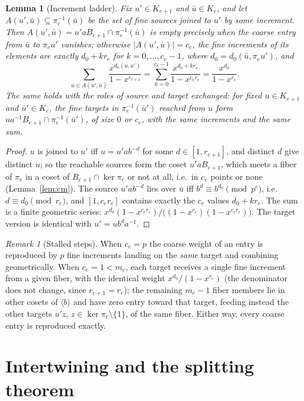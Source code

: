 \documentclass[11pt]{article}
\newtheorem{lemma}[theorem]{Lemma}
\theoremstyle{definition}
\theoremstyle{remark}
\newtheorem{remark}[theorem]{Remark}
\begin{document}
\begin{lemma}[Increment ladder]\label{lem:ladder}
Fix $u'\in K_{e+1}$ and $\bar u\in K_e$, and let $A(u',\bar u)\subseteq\pi_e^{-1}(\bar u)$ be the set of fine sources joined to $u'$ by some increment. Then $A(u',\bar u)=u'aB_{e+1}\cap\pi_e^{-1}(\bar u)$ is empty precisely when the coarse entry from $\bar u$ to $\pi_eu'$ vanishes; otherwise $|A(u',\bar u)|=c_e$, the fine increments of its elements are exactly $d_0+kr_e$ for $k=0,\dots,c_e-1$, where $d_0=d_0(\bar u,\pi_eu')$, and
\[
\sum_{u\in A(u',\bar u)}\frac{x^{d_0(u,u')}}{1-x^{r_{e+1}}}
=\sum_{k=0}^{c_e-1}\frac{x^{d_0+kr_e}}{1-x^{c_er_e}}
=\frac{x^{d_0}}{1-x^{r_e}} .
\]
The same holds with the roles of source and target exchanged: for fixed $u\in K_{e+1}$ and $\bar u'\in K_e$, the fine targets in $\pi_e^{-1}(\bar u')$ reached from $u$ form $ua^{-1}B_{e+1}\cap\pi_e^{-1}(\bar u')$, of size $0$ or $c_e$, with the same increments and the same sum.
\end{lemma}

\begin{proof}
$u$ is joined to $u'$ iff $u=u'ab^{-d}$ for some $d\in[1,r_{e+1}]$, and distinct $d$ give distinct $u$; so the reachable sources form the coset $u'aB_{e+1}$, which meets a fiber of $\pi_e$ in a coset of $B_{e+1}\cap\ker\pi_e$ or not at all, i.e.\ in $c_e$ points or none (Lemma~\ref{lem:cm}). The source $u'ab^{-d}$ lies over $\bar u$ iff $b^{d}\equiv b^{d_0}\pmod{p^e}$, i.e.\ $d\equiv d_0\pmod{r_e}$, and $[1,c_er_e]$ contains exactly the $c_e$ values $d_0+kr_e$. The sum is a finite geometric series: $x^{d_0}(1-x^{c_er_e})/\big((1-x^{r_e})(1-x^{c_er_e})\big)$. The target version is identical with $u'=ub^da^{-1}$.
\end{proof}

\begin{remark}[Stalled steps]\label{rem:stall}
When $c_e=p$ the coarse weight of an entry is reproduced by $p$ fine increments landing on the \emph{same} target and combining geometrically. When $c_e=1<m_e$, each target receives a single fine increment from a given fiber, with the identical weight $x^{d_0}/(1-x^{r_e})$ (the denominator does not change, since $r_{e+1}=r_e$); the remaining $m_e-1$ fiber members lie in other cosets of $\langle b\rangle$ and have zero entry toward that target, feeding instead the other targets $u'z$, $z\in\ker\pi_e\setminus\{1\}$, of the same fiber. Either way, every coarse entry is reproduced exactly.
\end{remark}

\section{Intertwining and the splitting theorem}
\end{document}
